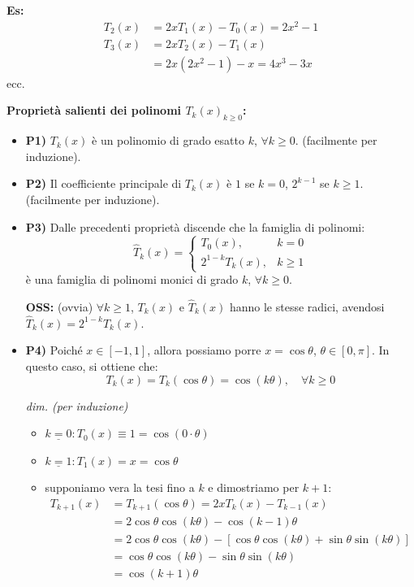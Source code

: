 \textbf{Es:}
\begin{align*}
T_2(x) &= 2x T_1(x) - T_0(x) = 2x^2 - 1 \\
T_3(x) &= 2x T_2(x) - T_1(x) \\
&= 2x(2x^2 - 1) - x = 4x^3 - 3x
\end{align*}
ecc.

\vspace{0.5cm}
\textbf{Proprietà salienti dei polinomi ${T_k(x)}_{k \ge 0}$:}
\begin{itemize}
    \item \textbf{P1)} $T_k(x)$ è un polinomio di grado esatto $k$, $\forall k \ge 0$. (facilmente per induzione).
    \item \textbf{P2)} Il coefficiente principale di $T_k(x)$ è $1$ se $k=0$, $2^{k-1}$ se $k \ge 1$. (facilmente per induzione).
    \item \textbf{P3)} Dalle precedenti proprietà discende che la famiglia di polinomi:
    $$ \hat{T}_k(x) = \begin{cases} T_0(x), & k=0 \\ 2^{1-k}T_k(x), & k \ge 1 \end{cases} $$
    è una famiglia di polinomi monici di grado $k$, $\forall k \ge 0$.
    
    \textbf{OSS:} (ovvia) $\forall k \ge 1$, $T_k(x)$ e $\hat{T}_k(x)$ hanno le stesse radici, avendosi $\hat{T}_k(x) = 2^{1-k}T_k(x)$.
    
    \item \textbf{P4)} Poiché $x \in [-1,1]$, allora possiamo porre $x = \cos \theta$, $\theta \in [0,\pi]$. In questo caso, si ottiene che:
    \begin{equation} \label{eq:chebyshev_cos}
    T_k(x) = T_k(\cos \theta) = \cos(k\theta), \quad \forall k \ge 0
    \end{equation}
    
    \textit{dim. (per induzione)} 
    \begin{itemize}
        \item $\underline{k=0}: T_0(x) \equiv 1 = \cos(0 \cdot \theta)$ 
        \item $\underline{k=1}: T_1(x) = x = \cos \theta$ 
        \item supponiamo vera la tesi fino a $k$ e dimostriamo per $k+1$:
        \begin{align*}
        T_{k+1}(x) &= T_{k+1}(\cos \theta) = 2x T_k(x) - T_{k-1}(x) \\
        &= 2 \cos \theta \cos(k\theta) - \cos(k-1)\theta \\
        &= 2 \cos \theta \cos(k\theta) - [\cos \theta \cos(k\theta) + \sin \theta \sin(k\theta)] \\
        &= \cos \theta \cos(k\theta) - \sin \theta \sin(k\theta) \\
        &= \cos(k+1)\theta
        \end{align*}
    \end{itemize}
\end{itemize}

